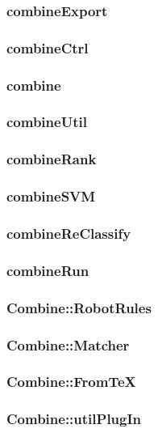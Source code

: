 \subsubsection{combineExport}

\htmlrule\hrulefill
\subsubsection{combineCtrl}

\htmlrule\hrulefill
\subsubsection{combine}

\htmlrule\hrulefill
\subsubsection{combineUtil}

\htmlrule\hrulefill
\subsubsection{combineRank}

\htmlrule\hrulefill
\subsubsection{combineSVM}

\htmlrule\hrulefill
\subsubsection{combineReClassify}

\htmlrule\hrulefill
\subsubsection{combineRun}

\htmlrule\hrulefill
\subsubsection{Combine::RobotRules}

\htmlrule\hrulefill
\subsubsection{Combine::Matcher}

\htmlrule\hrulefill
\subsubsection{Combine::FromTeX}

\htmlrule\hrulefill
\subsubsection{Combine::utilPlugIn}

\htmlrule\hrulefill
